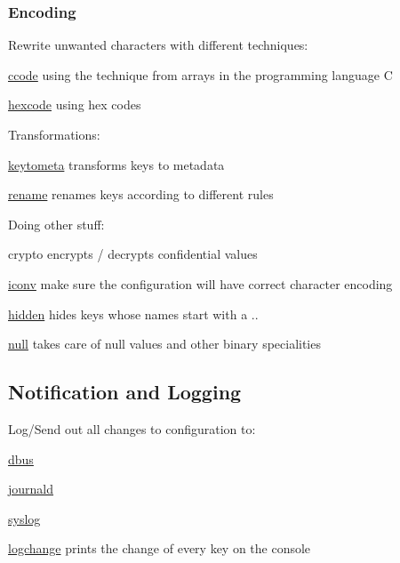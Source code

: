 \subsubsection*{Encoding}

Rewrite unwanted characters with different techniques\+:


\begin{DoxyItemize}
\item \hyperlink{md_src_plugins_ccode_README_src_plugins_ccode_README_md}{ccode} using the technique from arrays in the programming language C
\item \hyperlink{md_src_plugins_hexcode_README_src_plugins_hexcode_README_md}{hexcode} using hex codes
\end{DoxyItemize}

Transformations\+:


\begin{DoxyItemize}
\item \hyperlink{md_src_plugins_keytometa_README_src_plugins_keytometa_README_md}{keytometa} transforms keys to metadata
\item \hyperlink{md_src_plugins_rename_README_src_plugins_rename_README_md}{rename} renames keys according to different rules
\end{DoxyItemize}

Doing other stuff\+:


\begin{DoxyItemize}
\item crypto encrypts / decrypts confidential values
\item \hyperlink{md_src_plugins_iconv_README_src_plugins_iconv_README_md}{iconv} make sure the configuration will have correct character encoding
\item \hyperlink{md_src_plugins_hidden_README_src_plugins_hidden_README_md}{hidden} hides keys whose names start with a {\ttfamily .}.
\item \hyperlink{md_src_plugins_null_README_src_plugins_null_README_md}{null} takes care of null values and other binary specialities
\end{DoxyItemize}

\subsection*{Notification and Logging}

Log/\+Send out all changes to configuration to\+:


\begin{DoxyItemize}
\item \hyperlink{md_src_plugins_dbus_README_src_plugins_dbus_README_md}{dbus}
\item \hyperlink{md_src_plugins_journald_README_src_plugins_journald_README_md}{journald}
\item \hyperlink{md_src_plugins_syslog_README_src_plugins_syslog_README_md}{syslog}
\item \hyperlink{md_src_plugins_logchange_README_src_plugins_logchange_README_md}{logchange} prints the change of every key on the console
\end{DoxyItemize}


